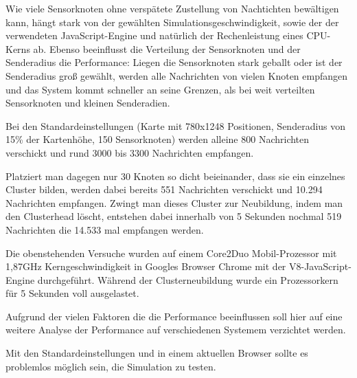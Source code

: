 Wie viele Sensorknoten ohne verspätete Zustellung von Nachtichten
bewältigen kann, hängt stark von der gewählten
Simulationsgeschwindigkeit, sowie der der verwendeten JavaScript-Engine
und natürlich der Rechenleistung eines CPU-Kerns ab. Ebenso beeinflusst
die Verteilung der Sensorknoten und der Senderadius die Performance:
Liegen die Sensorknoten stark geballt oder ist der Senderadius groß
gewählt, werden alle Nachrichten von vielen Knoten empfangen und das
System kommt schneller an seine Grenzen, als bei weit verteilten
Sensorknoten und kleinen Senderadien.

Bei den Standardeinstellungen (Karte mit 780x1248 Positionen,
Senderadius von 15\% der Kartenhöhe, 150 Sensorknoten) werden alleine
800 Nachrichten verschickt und rund 3000 bis 3300 Nachrichten empfangen.

Platziert man dagegen nur 30 Knoten so dicht beieinander, dass sie ein
einzelnes Cluster bilden, werden dabei bereits 551 Nachrichten
verschickt und 10.294 Nachrichten empfangen. Zwingt man dieses Cluster
zur Neubildung, indem man den Clusterhead löscht, entstehen dabei
innerhalb von 5 Sekunden nochmal 519 Nachrichten die 14.533 mal
empfangen werden.

Die obenstehenden Versuche wurden auf einem Core2Duo Mobil-Prozessor mit
1,87GHz Kerngeschwindigkeit in Googles Browser Chrome mit der
V8-JavaScript-Engine durchgeführt. Während der Clusterneubildung wurde
ein Prozessorkern für 5 Sekunden voll ausgelastet.

Aufgrund der vielen Faktoren die die Performance beeinflussen soll hier
auf eine weitere Analyse der Performance auf verschiedenen Systemem
verzichtet werden.

Mit den Standardeinstellungen und in einem aktuellen Browser sollte es
problemlos möglich sein, die Simulation zu testen.
